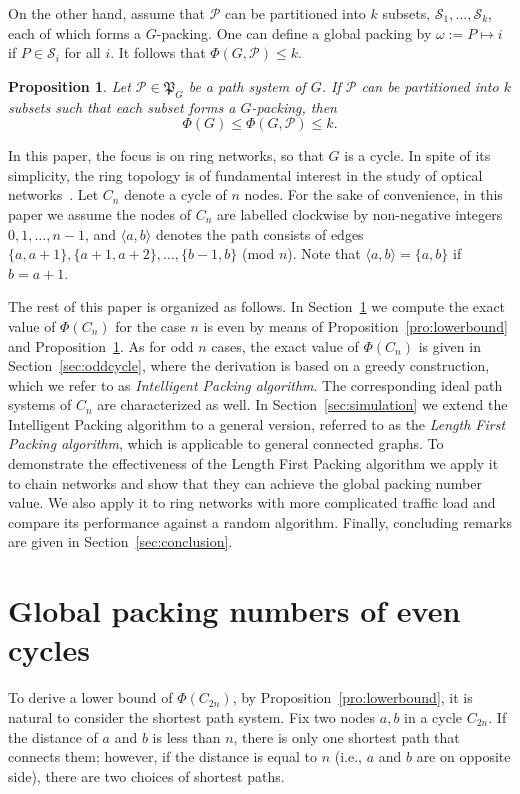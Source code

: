 \documentclass[journal,draftcls,onecolumn,12pt,twoside]{IEEEtran}
\newtheorem{proposition}[theorem]{\bf Proposition}
\begin{document}
On the other hand, assume that $\mathcal{P}$ can be partitioned into $k$ subsets, $\mathcal{S}_1,\ldots,\mathcal{S}_k$, each of which forms a $G$-packing. 
One can define a global packing by $\omega:=P\mapsto i$ if $P\in\mathcal{S}_i$ for all $i$. 
It follows that $\Phi(G,\mathcal{P})\leq k$.

\begin{proposition}\label{pro:upperbound}
Let $\mathcal{P}\in\mathfrak{P}_G$ be a path system of $G$.
If $\mathcal{P}$ can be partitioned into $k$ subsets such that each subset forms a $G$-packing, then
$$\Phi(G) \leq \Phi(G,\mathcal{P}) \leq k.$$
\end{proposition}

In this paper, the focus is on ring networks, so that $G$ is a cycle.
In spite of its simplicity, the ring topology is of fundamental interest in the study of optical networks~\cite{GCFPFGNP_01,GSCAC_09,PCF_05}.
Let $C_n$ denote a cycle of $n$ nodes.
For the sake of convenience, in this paper we assume the nodes of $C_n$ are labelled clockwise by non-negative integers $0,1,\ldots,n-1$, and $\langle a,b\rangle$ denotes the path consists of edges $\{a,a+1\},\{a+1,a+2\},\ldots,\{b-1,b\}$ (mod $n$).
Note that $\langle a,b\rangle=\{a,b\}$ if $b=a+1$.

The rest of this paper is organized as follows.
In Section~\ref{sec:evencycle} we compute the exact value of $\Phi(C_n)$ for the case $n$ is even by means of Proposition~\ref{pro:lowerbound} and Proposition~\ref{pro:upperbound}. 
As for odd $n$ cases, the exact value of $\Phi(C_n)$ is given in Section~\ref{sec:oddcycle}, where the derivation is based on a greedy construction, which we refer to as
{\em Intelligent Packing algorithm}.
The corresponding ideal path systems of $C_n$ are characterized as well.
In Section~\ref{sec:simulation} we extend the Intelligent Packing algorithm to a general version, referred to as the {\em Length First Packing algorithm}, which is applicable to
general connected graphs.  To demonstrate the effectiveness of the Length First
Packing algorithm we apply it to chain networks and show that they can achieve the global packing number value. 
We also apply it to ring networks with more complicated traffic
load and compare its performance against a random algorithm.
Finally, concluding remarks are given in Section~\ref{sec:conclusion}.


\section{Global packing numbers of even cycles}\label{sec:evencycle}
To derive a lower bound of $\Phi(C_{2n})$, by Proposition~\ref{pro:lowerbound}, it is natural to consider the shortest path system.
Fix two nodes $a,b$ in a cycle $C_{2n}$.
If the distance of $a$ and $b$ is less than $n$, there is only one shortest path that connects them; however, if the distance is equal to $n$ (i.e., $a$ and $b$ are on opposite side), there are two choices of shortest paths.
\end{document}
